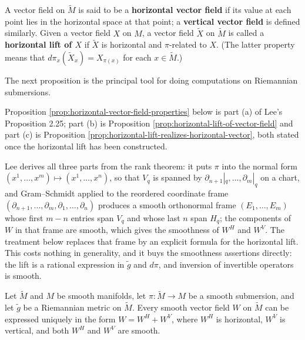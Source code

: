 A vector field on $\tilde{M}$ is said to be a \textbf{horizontal vector field} if its value at each point lies in the horizontal space at that point; a \textbf{vertical vector field} is defined similarly. Given a vector field $X$ on $M$, a vector field $\tilde{X}$ on $\tilde{M}$ is called a \textbf{horizontal lift of $X$} if $\tilde{X}$ is horizontal and $\pi$-related to $X$. (The latter property means that $d\pi_x(\tilde{X}_x) = X_{\pi(x)}$ for each $x \in \tilde{M}$.)

The next proposition is the principal tool for doing computations on Riemannian submersions.

Proposition \ref{prop:horizontal-vector-field-properties} below is part (a) of
Lee's Proposition 2.25; part (b) is Proposition
\ref{prop:horizontal-lift-of-vector-field} and part (c) is Proposition
\ref{prop:horizontal-lift-realizes-horizontal-vector}, both stated once the
horizontal lift has been constructed.

Lee derives all three parts from the rank theorem: it puts $\pi$ into the normal
form $(x^1,\ldots,x^m) \mapsto (x^1,\ldots,x^n)$, so that $V_q$ is spanned by
$\partial_{n+1}|_q,\ldots,\partial_m|_q$ on a chart, and Gram--Schmidt applied to
the reordered coordinate frame $(\partial_{n+1},\ldots,\partial_m,\partial_1,\ldots,\partial_n)$
produces a smooth orthonormal frame $(E_1,\ldots,E_m)$ whose first $m-n$ entries
span $V_q$ and whose last $n$ span $H_q$; the components of $W$ in that frame are
smooth, which gives the smoothness of $W^H$ and $W^V$. The treatment below
replaces that frame by an explicit formula for the horizontal lift. This costs
nothing in generality, and it buys the smoothness assertions directly: the lift is
a rational expression in $\tilde{g}$ and $d\pi$, and inversion of invertible
operators is smooth.

\begin{proposition}
\label{prop:horizontal-vector-field-properties}
\leanok
{}

Let $\tilde{M}$ and $M$ be smooth manifolds, let $\pi : \tilde{M} \to M$ be a smooth submersion, and let $\tilde{g}$ be a Riemannian metric on $\tilde{M}$. Every smooth vector field $W$ on $\tilde{M}$ can be expressed uniquely in the form $W = W^H + W^V$, where $W^H$ is horizontal, $W^V$ is vertical, and both $W^H$ and $W^V$ are smooth.
\end{proposition}

